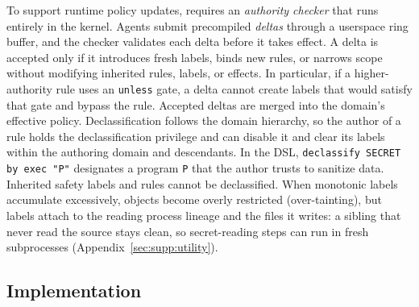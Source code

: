 To support runtime policy updates, \sys{} requires an \emph{authority checker} that runs entirely in the kernel.
Agents submit precompiled \emph{deltas} through a userspace ring buffer, and the checker validates each delta before it takes effect.
A delta is accepted only if it introduces fresh labels, binds new rules, or narrows scope without modifying inherited rules, labels, or effects.
In particular, if a higher-authority rule uses an \texttt{unless} gate, a delta cannot create labels that would satisfy that gate and bypass the rule.
Accepted deltas are merged into the domain's effective policy.
Declassification follows the domain hierarchy, so the author of a rule holds the declassification privilege and can disable it and clear its labels within the authoring domain and descendants.
In the DSL, \texttt{declassify SECRET by exec "P"} designates a program \texttt{P} that the author trusts to sanitize data.
Inherited safety labels and rules cannot be declassified.
When monotonic labels accumulate excessively, objects become overly restricted (over-tainting), but labels attach to the reading process lineage and the files it writes: a sibling that never read the source stays clean, so secret-reading steps can run in fresh subprocesses (Appendix~\ref{sec:supp:utility}).

\subsection{Implementation}
\label{sec:implementation}

